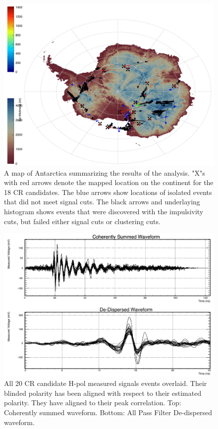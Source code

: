 		\begin{figure}
			\centering
				\includegraphics[width=\textwidth]{figures/allEventsMap}
				\caption{A map of Antarctica summarizing the results of the analysis.  "X"s with red arrows denote the mapped location on the continent for the 18 CR candidates.  The blue arrows show locations of isolated events that did not meet signal cuts.  The black arrows and underlaying histogram shows events that were discovered with the impulsivity cuts, but failed either signal cuts or clustering cuts. } 
			\label{fig:allEventsMap}
		\end{figure}		
		
		\begin{figure}
			\centering
				\includegraphics[width=\textwidth]{figures/hPolOverlay}
				\caption{All 20 CR candidate H-pol measured signals events overlaid.  Their blinded polarity has been aligned with respect to their estimated polarity.  They have aligned to their peak correlation.  Top: Coherently summed waveform.  Bottom: All Pass Filter De-dispersed waveform. } 
			\label{fig:hPolOverlay}
		\end{figure}
		
